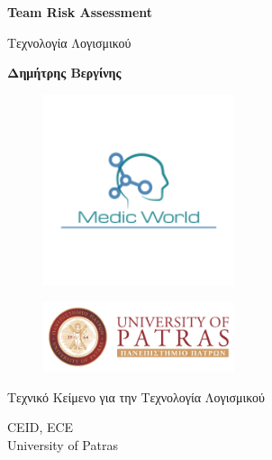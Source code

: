 \documentclass{article}
\begin{document}
\begin{titlepage}
   \begin{center}
       \vspace*{1cm}

       \textbf{\huge Team Risk Assessment}

       \vspace{0.5cm}
        Τεχνολογία Λογισμικού
            
       \vspace{1cm}

       \textbf{Δημήτρης Βεργίνης}
       
       \begin{figure}[!htb]
        \centering
        \includegraphics[width=0.5\textwidth]{logo.png}
        \end{figure}
        
        \vspace{0.5cm}
        
        \begin{figure}[!htb]
        \centering
        \includegraphics[width=0.5\textwidth]{ceid.jpg}
        \end{figure}


       \vfill
            
       Τεχνικό Κείμενο για την Τεχνολογία Λογισμικού\\
            
       \vspace{0.5cm}
            
       CEID, ECE\\
       University of Patras\\
            
   \end{center}
\end{titlepage}
\end{document}
